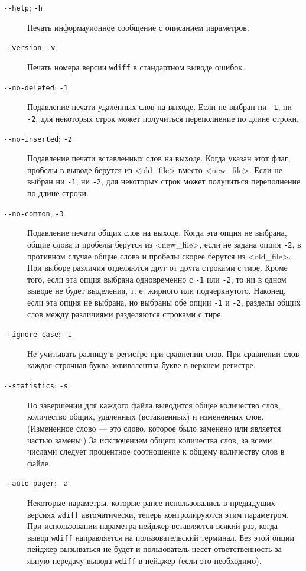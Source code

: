 \begin{description}
\item[\texttt{-\/-help}; \texttt{-h}]
Печать информауионное сообщение с описанием параметров.
\item[\texttt{-\/-version}; \texttt{-v}]
Печать номера версии \texttt{wdiff} в стандартном выводе ошибок.
\item[\texttt{-\/-no-deleted}; \texttt{-1}]
Подавление печати удаленных слов на выходе. Если не выбран ни
\texttt{-1}, ни \texttt{-2}, для некоторых строк может получиться
переполнение по длине строки.
\item[\texttt{-\/-no-inserted}; \texttt{-2}]
Подавление печати вставленных слов на выходе. Когда указан этот флаг,
пробелы в выводе берутся из \textless old\_file\textgreater{} вместо
\textless new\_file\textgreater. Если не выбран ни \texttt{-1}, ни
\texttt{-2}, для некоторых строк может получиться переполнение по длине
строки.
\item[\texttt{-\/-no-common}; \texttt{-3}]
Подавление печати общих слов на выходе. Когда эта опция не выбрана,
общие слова и пробелы берутся из \textless new\_file\textgreater, если
не задана опция \texttt{-2}, в противном случае общие слова и пробелы
скорее берутся из \textless old\_file\textgreater. При выборе различия
отделяются друг от друга строками с тире. Кроме того, если эта опция
выбрана одновременно с \texttt{-1} или \texttt{-2}, то ни в одном выводе
не будет выделения, т. е. жирного или подчеркнутого. Наконец, если эта
опция не выбрана, но выбраны обе опции \texttt{-1} и \texttt{-2},
разделы общих слов между различиями разделяются строками с тире.
\item[\texttt{-\/-ignore-case}; \texttt{-i}]
Не учитывать разницу в регистре при сравнении слов. При сравнении слов
каждая строчная буква эквивалентна букве в верхнем регистре.
\item[\texttt{-\/-statistics}; \texttt{-s}]
По завершении для каждого файла выводится общее количество слов,
количество общих, удаленных (вставленных) и измененных слов. (Измененное
слово --- это слово, которое было заменено или является частью замены.)
За исключением общего количества слов, за всеми числами следует
процентное соотношение к общему количеству слов в файле.
\item[\texttt{-\/-auto-pager}; \texttt{-a}]
Некоторые параметры, которые ранее использовались в предыдущих версиях
\texttt{wdiff} автоматически, теперь контролируются этим параметром. При
использовании параметра пейджер вставляется всякий раз, когда вывод
\texttt{wdiff} направляется на пользовательский терминал. Без этой опции
пейджер вызываться не будет и пользователь несет ответственность за
явную передачу вывода \texttt{wdiff} в пейджер (если это необходимо).


\end{description}
